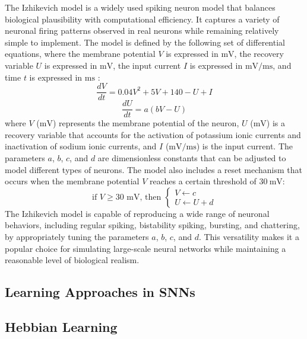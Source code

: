 The Izhikevich model is a widely used spiking neuron model that balances biological plausibility with computational efficiency. It captures a variety of neuronal firing patterns observed in real neurons while remaining relatively simple to implement. The model is defined by the following set of differential equations, where the membrane potential \(V\) is expressed in \(\mathrm{mV}\), the recovery variable \(U\) is expressed in \(\mathrm{mV}\), the input current \(I\) is expressed in \(\mathrm{mV/ms}\), and time \(t\) is expressed in \(\mathrm{ms}\) \cite{Ch_1_R14}:
\begin{equation}
    \frac{dV}{dt} = 0.04V^2 + 5V + 140 - U + I
\end{equation}
\begin{equation}
    \frac{dU}{dt} = a(bV - U)
\end{equation}
\noindent where \(V\) (\(\mathrm{mV}\)) represents the membrane potential of the neuron, \(U\) (\(\mathrm{mV}\)) is a recovery variable that accounts for the activation of potassium ionic currents and inactivation of sodium ionic currents, and \(I\) (\(\mathrm{mV/ms}\)) is the input current. The parameters \(a\), \(b\), \(c\), and \(d\) are dimensionless constants that can be adjusted to model different types of neurons. The model also includes a reset mechanism that occurs when the membrane potential \(V\) reaches a certain threshold of \(30~\mathrm{mV}\):
\begin{equation}
    \text{if } V \geq 30 \text{ mV, then } 
    \begin{cases}
        V \leftarrow c \\
        U \leftarrow U + d
    \end{cases}
\end{equation}
The Izhikevich model is capable of reproducing a wide range of neuronal behaviors, including regular spiking, bistability spiking, bursting, and chattering, by appropriately tuning the parameters \(a\), \(b\), \(c\), and \(d\). This versatility makes it a popular choice for simulating large-scale neural networks while maintaining a reasonable level of biological realism.


\subsection{Learning Approaches in SNNs}

\subsection*{Hebbian Learning}

